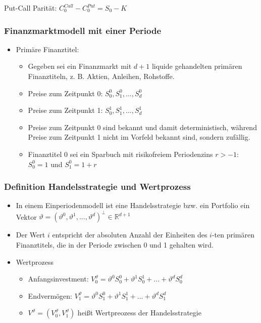 \documentclass[12pt]{report}
\theoremstyle{dotless}
\theoremstyle{definition}
\begin{document}
Put-Call Parität: $C_0^{Call} - C_0^{Put} = S_0 - K$

\subsubsection{Finanzmarktmodell mit einer Periode}
\begin{itemize}
\item Primäre Finanztitel:
\begin{itemize}
\item Gegeben sei ein Finanzmarkt mit $d + 1$ liquide gehandelten primären
Finanztiteln, z. B. Aktien, Anleihen, Rohstoffe.
\item Preise zum Zeitpunkt 0: $S^0_0, S^0_1,...,S^0_d$
\item Preise zum Zeitpunkt 1: $S^1_0, S^1_1,..., S^1_d$
\item Preise zum Zeitpunkt 0 sind bekannt und damit deterministisch, während
Preise zum Zeitpunkt 1 nicht im Vorfeld bekannt sind, sondern zufällig.
\item Finanztitel 0 sei ein Sparbuch mit risikofreiem Periodenzins $r > -1$:\\
$S^0_0 = 1$ und $S_1^0 = 1+r$
\end{itemize}
\end{itemize}

\subsubsection{Definition Handelsstrategie und Wertprozess}

\begin{itemize}
\item In einem Einperiodenmodell ist eine Handelsstrategie bzw. ein Portfolio ein
Vektor $\vartheta = (\vartheta^0, \vartheta^1, ..., \vartheta^d)^\perp \in \mathbb{R}^{d+1}$
\item Der Wert $i$ entspricht der absoluten Anzahl der Einheiten des $i$-ten primären
Finanztitels, die in der Periode zwischen 0 und 1 gehalten wird.
\item Wertprozess
\begin{itemize}
\item Anfangsinvestment:  $V_0^\vartheta= \vartheta^0S^0_0 + \vartheta^1S_0^1 +...+\vartheta^dS_0^d$
\item Endvermögen: $V_1^\vartheta= \vartheta^0S^0_1 + \vartheta^1S_1^1 +...+\vartheta^dS_1^d$
\item $V^\vartheta = (V_0^\vartheta, V_1^\vartheta)$ heißt Wertpreozess der Handelsstrategie
\end{itemize}
\end{itemize}
\end{document}
